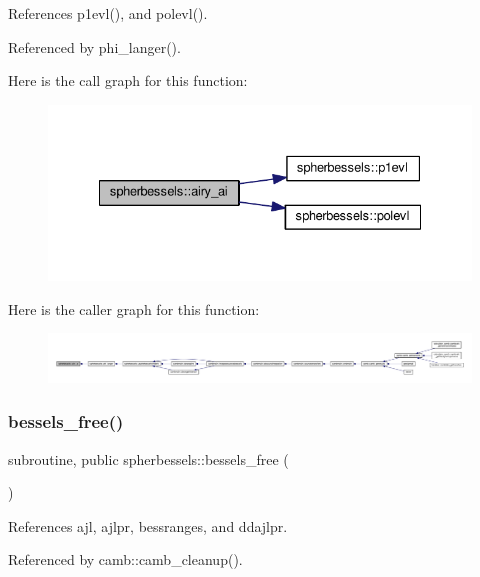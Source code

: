 References p1evl(), and polevl().



Referenced by phi\+\_\+langer().

Here is the call graph for this function\+:
\nopagebreak
\begin{figure}[H]
\begin{center}
\leavevmode
\includegraphics[width=332pt]{namespacespherbessels_a4a053c46f90faa3400f9619fc31cbd1d_cgraph}
\end{center}
\end{figure}
Here is the caller graph for this function\+:
\nopagebreak
\begin{figure}[H]
\begin{center}
\leavevmode
\includegraphics[width=350pt]{namespacespherbessels_a4a053c46f90faa3400f9619fc31cbd1d_icgraph}
\end{center}
\end{figure}
\mbox{\label{namespacespherbessels_a0abb3ebb234b8547151b14c0cdb439be}} 
\subsubsection{\texorpdfstring{bessels\+\_\+free()}{bessels\_free()}}
{\footnotesize\ttfamily subroutine, public spherbessels\+::bessels\+\_\+free (\begin{DoxyParamCaption}{ }\end{DoxyParamCaption})}



References ajl, ajlpr, bessranges, and ddajlpr.



Referenced by camb\+::camb\+\_\+cleanup().

